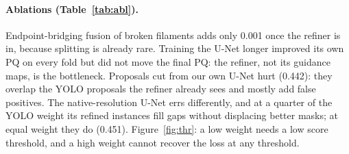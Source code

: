 \documentclass[10pt,twocolumn]{article}
\begin{document}
\begin{table}[t]
\centering\small\setlength{\tabcolsep}{3pt}
\caption{Ablations. Top: fold 0 (142 images, settings tuned on fold 0). Bottom: pooled 707-image OOF.}
\label{tab:abl}
\end{table}

\paragraph{Ablations (Table~\ref{tab:abl}).} Endpoint-bridging fusion of broken filaments adds only 0.001
once the refiner is in, because splitting is already rare. Training the U-Net longer improved its own PQ on
every fold but did not move the final PQ: the refiner, not its guidance maps, is the bottleneck. Proposals
cut from our own U-Net hurt (0.442): they overlap the YOLO proposals the refiner already sees and mostly add
false positives. The native-resolution U-Net errs differently, and at a quarter of the YOLO weight its
refined instances fill gaps without displacing better masks; at equal weight they do (0.451).
Figure~\ref{fig:thr}: a low weight needs a low score threshold, and a high weight cannot recover the loss
at any threshold.
\end{document}
